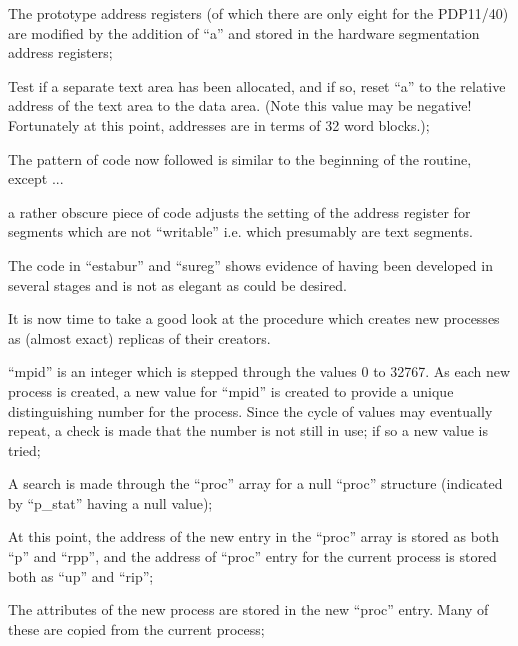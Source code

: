 \item[1744:] The prototype address registers
 (of which there are only eight
 for the PDP11/40) are modified by
 the addition of ``a'' and stored in
 the hardware segmentation address
 registers;

\item[1752:] Test if a separate text area has
 been allocated, and if so, reset
 ``a'' to the relative address of
 the text area to the data area.
 (Note this value may be negative!
 Fortunately at this point,
 addresses are in terms of 32 word
 blocks.);

\item[1754:] The pattern of code now followed
 is similar to the beginning of
 the routine, except ...

\item[1762:] a rather obscure piece of code
adjusts the setting of the
address register for segments
which are not ``writable'' i.e.
which presumably are text segments.
\ed

The code in ``estabur'' and ``sureg'' shows
evidence of having been developed in
several stages and is not as elegant as
could be desired.


It is now time to take a good look at
the procedure which creates new
processes as (almost exact) replicas of
their creators.


\bd
\item[1841:] ``mpid'' is an integer which is
 stepped through the values 0 to
 32767. As each new process is
 created, a new value for ``mpid''
 is created to provide a unique
distinguishing number for the
process. Since the cycle of
values may eventually repeat, a
check is made that the number is
not still in use; if so a new
value is tried;

\item[1846:] A search is made through the
 ``proc'' array for a null ``proc''
 structure (indicated by ``p\_stat''
 having a null value);


\item[1860:] At this point, the address of the
new entry in the ``proc'' array is
stored as both ``p'' and ``rpp'', and
the address of ``proc'' entry for
the current process is stored both
as ``up'' and ``rip'';

\item[1861:] The attributes of the new process
are stored in the new ``proc''
entry. Many of these are copied
from the current process;

